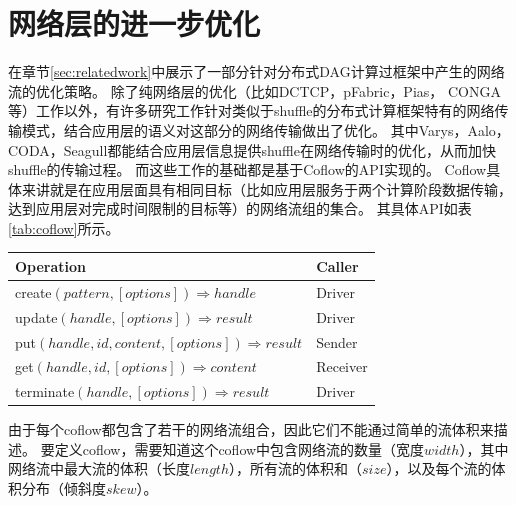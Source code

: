\section{网络层的进一步优化}
\label{sec:network}

在章节\ref{sec:relatedwork}中展示了一部分针对分布式DAG计算过框架中产生的网络流的优化策略。
除了纯网络层的优化（比如DCTCP\cite{dctcp}，pFabric\cite{pfabric}，Pias\cite{pias}， CONGA\cite{conga}等）工作以外，有许多研究工作针对类似于shuffle的分布式计算框架特有的网络传输模式，结合应用层的语义对这部分的网络传输做出了优化。
其中Varys\cite{varys}，Aalo\cite{aalo}，CODA\cite{coda}，Seagull\cite{seagull}都能结合应用层信息提供shuffle在网络传输时的优化，从而加快shuffle的传输过程。
而这些工作的基础都是基于Coflow\cite{coflow}的API实现的。
Coflow具体来讲就是在应用层面具有相同目标（比如应用层服务于两个计算阶段数据传输，达到应用层对完成时间限制的目标等）的网络流组的集合。
其具体API\cite{coflow}如表\ref{tab:coflow}所示。

\begin{table}[!hpb]
    \centering
    \begin{tabular}{ | m{10cm} | m{5cm} | }
        \hline
        Operation & Caller \\ [0.5ex]
        \hline
        \hline
        create$(pattern, [options]) \Rightarrow handle$ & Driver\\ \hline
        update$(handle, [options]) \Rightarrow result$ & Driver \\ \hline
        put$(handle, id, content, [options]) \Rightarrow result$ & Sender \\ \hline
        get$(handle, id, [options]) \Rightarrow content$ & Receiver \\ \hline
        terminate$(handle, [options]) \Rightarrow result$ & Driver \\ 
        \hline
    \end{tabular}
\end{table}

由于每个coflow都包含了若干的网络流组合，因此它们不能通过简单的流体积来描述。
要定义coflow，需要知道这个coflow中包含网络流的数量（宽度$width$），其中网络流中最大流的体积（长度$length$），所有流的体积和（$size$），以及每个流的体积分布（倾斜度$skew$）。

